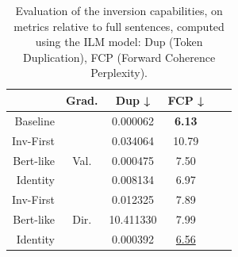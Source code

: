 \documentclass[../thesis.tex]{subfiles}
\begin{document}
\begin{table}[bthp]
\centering
\begin{tabular}{rccccc}
\toprule
           & \textbf{Grad.} & \textbf{Dup ↓} & \textbf{FCP ↓}    \\
\midrule
Baseline   &                & 0.000062       & \textbf{6.13}     \\
\midrule
Inv-First  &                & 0.034064       & 10.79             \\
Bert-like  & Val.           & 0.000475       & 7.50              \\
Identity   &                & 0.008134       & 6.97              \\
\midrule
Inv-First  &                & 0.012325       & 7.89              \\
Bert-like  & Dir.           & 10.411330      & 7.99              \\
Identity   &                & 0.000392       & \underline{6.56}  \\
\bottomrule
\end{tabular}
\vspace{0.25cm}
\caption{Evaluation of the inversion capabilities, on metrics relative to full sentences, computed using the ILM model: Dup (Token Duplication), FCP (Forward Coherence Perplexity).}
\label{tab:ilm-evaluation-sentences-metrics}
\end{table}


\end{document}
